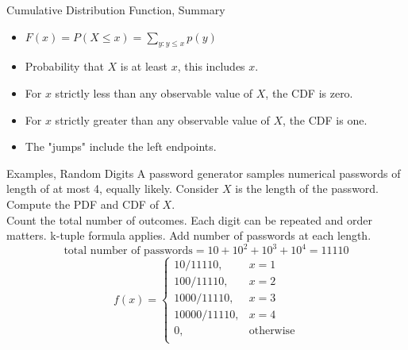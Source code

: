 \documentclass[handout]{beamer}
\newcommand{\nl}[1]{\vspace{#1 em}}
\begin{document}
    \begin{frame}{Cumulative Distribution Function, Summary}
        \begin{itemize}
            \item $F(x) = P(X \leq x) = \sum_{y:y\leq x} p(y)$
            \item Probability that $X$ is at least $x$, this includes $x$.
            \item For $x$ strictly less than any observable value of $X$, the CDF is zero.
            \item For $x$ strictly greater than any observable value of $X$, the CDF is one.
            \item The "jumps" include the left endpoints.
        \end{itemize}
    \end{frame}

    \begin{frame}{Examples, Random Digits}
        A password generator samples numerical passwords of length of at most 4, equally likely. Consider $X$ is the length of the password. Compute the PDF and CDF of $X$.\\ \nl{0.5}
        \pause
        Count the total number of outcomes. \pause Each digit can be repeated and order matters. \pause k-tuple formula applies. Add number of passwords at each length.
        \pause $$ \text{total number of passwords} = 10 + 10^2 + 10^3 + 10^4= 11110$$
        \pause $$f(x)= \left\{\begin{array}{lr}
            10/11110, & x = 1\\
            100/11110, &  x = 2\\
            1000/11110, &  x = 3\\
            10000/11110, &  x = 4\\
            0, & \text{otherwise}\\
            \end{array}\right.$$
    \end{frame}
\end{document}
